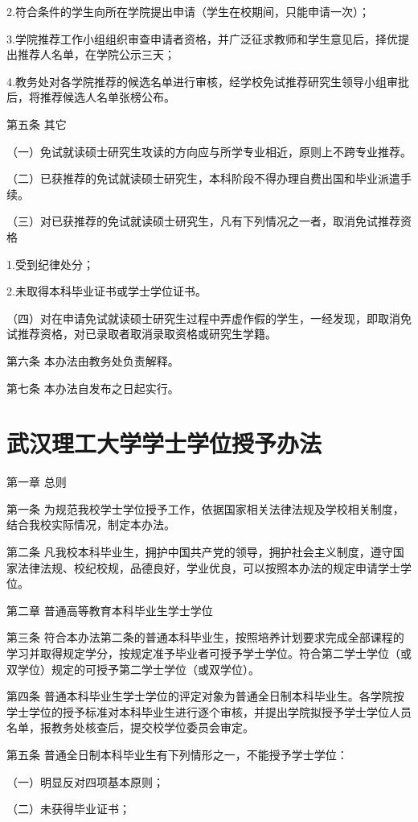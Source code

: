 \documentclass[UTF8,12pt,a4paper]{report}
\begin{document}
2.符合条件的学生向所在学院提出申请（学生在校期间，只能申请一次）；

3.学院推荐工作小组组织审查申请者资格，并广泛征求教师和学生意见后，择优提出推荐人名单，在学院公示三天；

4.教务处对各学院推荐的候选名单进行审核，经学校免试推荐研究生领导小组审批后，将推荐候选人名单张榜公布。

第五条 其它

（一）免试就读硕士研究生攻读的方向应与所学专业相近，原则上不跨专业推荐。

（二）已获推荐的免试就读硕士研究生，本科阶段不得办理自费出国和毕业派遣手续。

（三）对已获推荐的免试就读硕士研究生，凡有下列情况之一者，取消免试推荐资格

1.受到纪律处分；

2.未取得本科毕业证书或学士学位证书。

（四）对在申请免试就读硕士研究生过程中弄虚作假的学生，一经发现，即取消免试推荐资格，对已录取者取消录取资格或研究生学籍。

第六条 本办法由教务处负责解释。

第七条 本办法自发布之日起实行。

\chapter{武汉理工大学学士学位授予办法}
第一章 总则

第一条  为规范我校学士学位授予工作，依据国家相关法律法规及学校相关制度，结合我校实际情况，制定本办法。

第二条  凡我校本科毕业生，拥护中国共产党的领导，拥护社会主义制度，遵守国家法律法规、校纪校规，品德良好，学业优良，可以按照本办法的规定申请学士学位。



第二章 普通高等教育本科毕业生学士学位

第三条  符合本办法第二条的普通本科毕业生，按照培养计划要求完成全部课程的学习并取得规定学分，按规定准予毕业者可授予学士学位。符合第二学士学位（或双学位）规定的可授予第二学士学位（或双学位）。

第四条  普通本科毕业生学士学位的评定对象为普通全日制本科毕业生。各学院按学士学位的授予标准对本科毕业生进行逐个审核，并提出学院拟授予学士学位人员名单，报教务处核查后，提交校学位委员会审定。

第五条  普通全日制本科毕业生有下列情形之一，不能授予学士学位：

（一）明显反对四项基本原则；

（二）未获得毕业证书；
\end{document}
